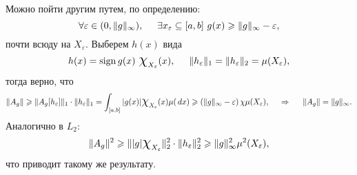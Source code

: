 Можно пойти другим путем, по определению:
\begin{equation*}
    \forall \varepsilon \in (0, \|g\|_\infty), \hspace{5 mm} 
    \exists x_\varepsilon \subseteq [a, b] \ 
    g(x) \geq \|g\|_\infty - \varepsilon,
\end{equation*}
почти всюду на $X_\varepsilon$. Выберем $h(x)$ вида
\begin{equation*}
    h(x) = \sign g(x) \ \cf{X_\varepsilon} (x),
    \hspace{5 mm} 
    \|h_\varepsilon\|_1 = \|h_\varepsilon\|_2 = \mu(X_\varepsilon), 
\end{equation*}
тогда верно, что
\begin{equation*}
    \|A_g\| \geq \|A_g [h_\varepsilon]\|_1 \cdot \|h_\varepsilon\|_1 = \int_{[a, b]} |g(x)| \cf{X_\varepsilon} (x) \mu(\d x) \geq \left(
        \|g\|_{\infty} - \varepsilon
    \right) \chi \mu(X_\varepsilon),
    \hspace{0.5cm} \Rightarrow \hspace{0.5cm}
    \|A_g\| = \|g\|_\infty.
\end{equation*}
Аналогично в $L_2$:
\begin{equation*}
    \|A_g\|^2 \geq \||g| \cf{X_\varepsilon}\|_2^2 \cdot \|h_\varepsilon\|_2^2 \geq \|g\|_\infty^2 \mu^2(X_\varepsilon),
\end{equation*}
что приводит такому же результату. 

